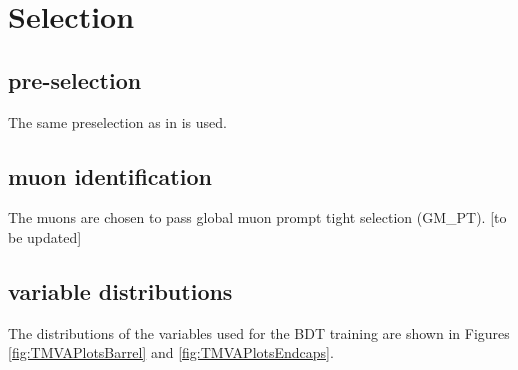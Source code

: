 \section{Selection}

\subsection{pre-selection}

The same preselection as in \cite{MainAN} is used. 


\subsection{muon identification}

The muons are chosen to pass global muon prompt tight
selection (GM\_PT). [to be updated]



\subsection{variable distributions}

The distributions of the variables used for the BDT training are shown in Figures \ref{fig:TMVAPlotsBarrel} and \ref{fig:TMVAPlotsEndcaps}.

\newpage

